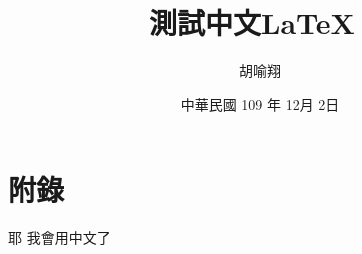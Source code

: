\documentclass[12pt, a4paper]{article}
\begin{document}
\title{測試中文\LaTeX\ }
\author{胡喻翔}
\date{中華民國 109 年 12月 2日}
\maketitle

\section{附錄}
耶 我會用中文了
\end{document}
